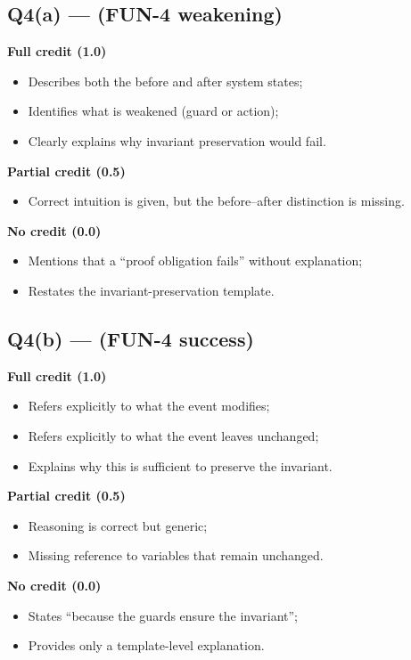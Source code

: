 \documentclass{article} %
\begin{document}
\bigskip

\subsection*{Q4(a) --- (FUN-4 weakening)}

\noindent
\textbf{Full credit (1.0)}
\begin{itemize}
  \item Describes both the before and after system states;
  \item Identifies what is weakened (guard or action);
  \item Clearly explains why invariant preservation would fail.
\end{itemize}

\noindent
\textbf{Partial credit (0.5)}
\begin{itemize}
  \item Correct intuition is given, but the before--after distinction is missing.
\end{itemize}

\noindent
\textbf{No credit (0.0)}
\begin{itemize}
  \item Mentions that a ``proof obligation fails'' without explanation;
  \item Restates the invariant-preservation template.
\end{itemize}

\bigskip

\subsection*{Q4(b) --- (FUN-4 success)}

\noindent
\textbf{Full credit (1.0)}
\begin{itemize}
  \item Refers explicitly to what the event modifies;
  \item Refers explicitly to what the event leaves unchanged;
  \item Explains why this is sufficient to preserve the invariant.
\end{itemize}

\noindent
\textbf{Partial credit (0.5)}
\begin{itemize}
  \item Reasoning is correct but generic;
  \item Missing reference to variables that remain unchanged.
\end{itemize}

\noindent
\textbf{No credit (0.0)}
\begin{itemize}
  \item States ``because the guards ensure the invariant'';
  \item Provides only a template-level explanation.
\end{itemize}
\end{document}
